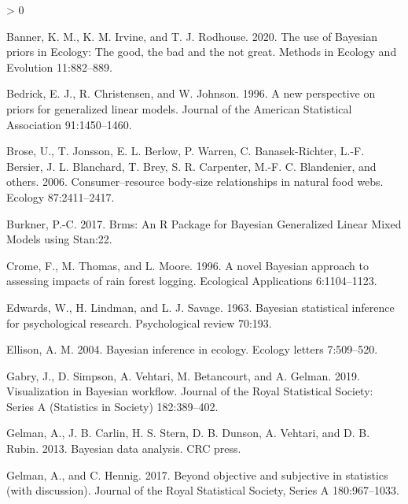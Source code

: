 \documentclass[
  12pt,
]{article}
\newlength{\cslhangindent}
\newenvironment{CSLReferences}[2] %
 {%
  \setlength{\parindent}{0pt}
  \ifodd #1 \everypar{\setlength{\hangindent}{\cslhangindent}}\ignorespaces\fi
  \ifnum #2 > 0
  \setlength{\parskip}{#2\baselineskip}
  \fi
 }%
 {}
\begin{document}
\hypertarget{refs}{}
\begin{CSLReferences}{1}{0}
\leavevmode\hypertarget{ref-banner_use_2020}{}%
Banner, K. M., K. M. Irvine, and T. J. Rodhouse. 2020. The use of
{Bayesian} priors in {Ecology}: {The} good, the bad and the not great.
Methods in Ecology and Evolution 11:882--889.

\leavevmode\hypertarget{ref-bedrick_new_1996}{}%
Bedrick, E. J., R. Christensen, and W. Johnson. 1996. A new perspective
on priors for generalized linear models. Journal of the American
Statistical Association 91:1450--1460.

\leavevmode\hypertarget{ref-brose_consumerresource_2006}{}%
Brose, U., T. Jonsson, E. L. Berlow, P. Warren, C. Banasek-Richter,
L.-F. Bersier, J. L. Blanchard, T. Brey, S. R. Carpenter, M.-F. C.
Blandenier, and others. 2006. Consumer--resource body-size relationships
in natural food webs. Ecology 87:2411--2417.

\leavevmode\hypertarget{ref-burkner_brms_2017}{}%
Burkner, P.-C. 2017. Brms: {An} {R} {Package} for {Bayesian}
{Generalized} {Linear} {Mixed} {Models} using {Stan}:22.

\leavevmode\hypertarget{ref-crome_novel_1996}{}%
Crome, F., M. Thomas, and L. Moore. 1996. A novel {Bayesian} approach to
assessing impacts of rain forest logging. Ecological Applications
6:1104--1123.

\leavevmode\hypertarget{ref-edwards_bayesian_1963}{}%
Edwards, W., H. Lindman, and L. J. Savage. 1963. Bayesian statistical
inference for psychological research. Psychological review 70:193.

\leavevmode\hypertarget{ref-ellison_bayesian_2004}{}%
Ellison, A. M. 2004. Bayesian inference in ecology. Ecology letters
7:509--520.

\leavevmode\hypertarget{ref-gabry_visualization_2019}{}%
Gabry, J., D. Simpson, A. Vehtari, M. Betancourt, and A. Gelman. 2019.
Visualization in {Bayesian} workflow. Journal of the Royal Statistical
Society: Series A (Statistics in Society) 182:389--402.

\leavevmode\hypertarget{ref-gelman_bayesian_2013}{}%
Gelman, A., J. B. Carlin, H. S. Stern, D. B. Dunson, A. Vehtari, and D.
B. Rubin. 2013. Bayesian data analysis. CRC press.

\leavevmode\hypertarget{ref-gelman_beyond_2017}{}%
Gelman, A., and C. Hennig. 2017. Beyond objective and subjective in
statistics (with discussion). Journal of the Royal Statistical Society,
Series A 180:967--1033.


\end{CSLReferences}
\end{document}
